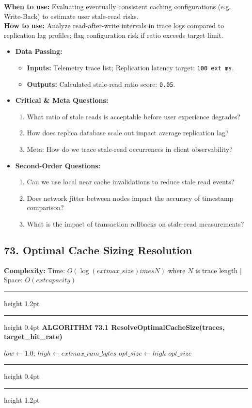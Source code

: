 \documentclass[11pt,a4paper]{article}
\newenvironment{textbookalgo}[2]{%
  \par\addvspace{1.2em}\noindent
  \hrule height 1.2pt
  \vspace{1.5pt}
  \hrule height 0.4pt
  \vspace{5pt}
  {\noindent\large\bfseries\sffamily ALGORITHM #1 \quad #2}
  \par\vspace{5pt}
  \RestyleAlgo{plain}
}{%
  \par\vspace{4pt}
  \hrule height 0.4pt
  \vspace{1.5pt}
  \hrule height 1.2pt
  \par\addvspace{1.2em}
}
\theoremstyle{definition}
\begin{document}
\noindent
\textbf{When to use:} Evaluating eventually consistent caching configurations (e.g. Write-Back) to estimate user stale-read risks.\\
\textbf{How to use:} Analyze read-after-write intervals in trace logs compared to replication lag profiles; flag configuration risk if ratio exceeds target limit.
\begin{itemize}[leftmargin=*]
  \item[] \textbf{Data Passing:}
    \begin{itemize}
      \item \textbf{Inputs:} Telemetry trace list; Replication latency target: \texttt{100	ext{ ms}}.
      \item \textbf{Outputs:} Calculated stale-read ratio score: \texttt{0.05}.
    \end{itemize}
  \item[] \textbf{Critical \& Meta Questions:}
  \begin{enumerate}
    \item What ratio of stale reads is acceptable before user experience degrades?
    \item How does replica database scale out impact average replication lag?
    \item Meta: How do we trace stale-read occurrences in client observability?
  \end{enumerate}
  \item[] \textbf{Second-Order Questions:}
  \begin{enumerate}
    \item Can we use local near cache invalidations to reduce stale read events?
    \item Does network jitter between nodes impact the accuracy of timestamp comparison?
    \item What is the impact of transaction rollbacks on stale-read measurements?
  \end{enumerate}
\end{itemize}
\medskip

\clearpage
\subsection{73. Optimal Cache Sizing Resolution}


\noindent
\textbf{Complexity:} Time: $O(\log(	ext{max\_size}) 	imes N)$ where $N$ is trace length | Space: $O(	ext{capacity})$
\smallskip

\begin{textbookalgo}{73.1}{ResolveOptimalCacheSize(traces, target\_hit\_rate)}
\begin{algorithm}[H]
$low \leftarrow 1.0$; $high \leftarrow 	ext{max\_ram\_bytes}$\;
$opt\_size \leftarrow high$\;
\Return $opt\_size$\;
\end{algorithm}
\end{textbookalgo}
\end{document}

